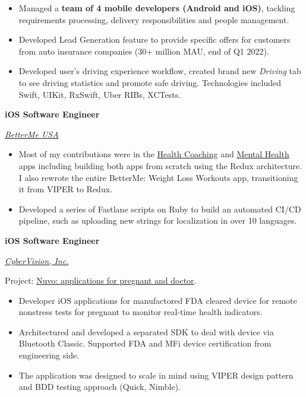 \documentclass[10pt]{article}
\newcommand{\SubSectionSpacing}{
    \vspace*{0.5em}
}
\newcommand{\Experience}[3]{%
    \noindent \textbf{#1}
    \hfill \text{#2} \par
    \noindent \textit{#3} \par
    \normalsize \normalfont \par
}
\begin{document}
\noindent
\begin{itemize}[label=-]
    \setlength\itemsep{0em}
    \item Managed a \textbf{team of 4 mobile developers (Android and iOS)}, tackling requirements processing, delivery responsibilities and people management. 
    \item Developed Lead Generation feature to provide specific offers for customers from auto insurance companies (30+ million MAU, end of Q1 2022).
    \item Developed user's driving experience workflow, created brand new \textit{Driving} tab to see driving statistics and promote safe driving. 
      Technologies included Swift, UIKit, RxSwift, Uber RIBs, XCTests.
\end{itemize}

\SubSectionSpacing

\Experience
{iOS Software Engineer}
{Nov 2018 -- Dec 2019}
{\href{https://betterme.world/about}{BetterMe USA}}

\noindent
\begin{itemize}[label=-]
    \setlength\itemsep{0em}
    \item Most of my contributions were in the \href{https://apps.apple.com/us/app/betterme-weight-loss-workouts/id1264546236}{Health Coaching} and \href{https://apps.apple.com/us/app/betterme-calm-sleep-meditate/id1363010081}{Mental Health} apps including building both apps from scratch using the Redux architecture. 
      I also rewrote the entire BetterMe: Weight Loss Workouts app, transitioning it from VIPER to Redux.
    \item Developed a series of Fastlane scripts on Ruby to build an automated CI/CD pipeline, such as uploading new strings for localization in over 10 languages.
\end{itemize}

\SubSectionSpacing

\Experience
{iOS Software Engineer}
{Oct 2015 -- Sep 2018}
{\href{https://www.cybervisiontech.com}{CyberVision, Inc.}}

\noindent Project: \href{https://www.nuvocares.com/solutions}{Nuvo: applications for pregnant and doctor}.
\noindent
\begin{itemize}[label=-]
    \setlength\itemsep{0em}
    \item Developer iOS applications for manufactored FDA cleared device for remote nonstress tests for pregnant to monitor real-time health indicators.
    \item Architectured and developed a separated SDK to deal with device via Bluetooth Classic. Supported FDA and MFi device certification from engineering side.
    \item The application was designed to scale in mind using VIPER design pattern and BDD testing approach (Quick, Nimble).
\end{itemize}
\end{document}

